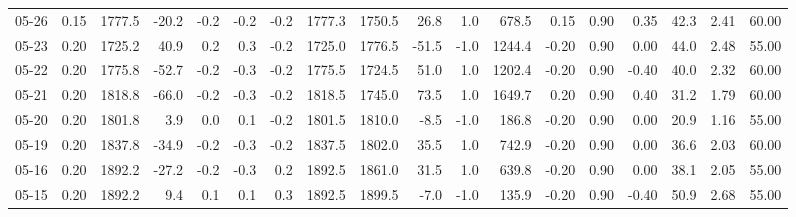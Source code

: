 \begin{threeparttable}
{\begin{tabular}{lrrrrrrrrrrrrrrrrr}
  05-26 &     0.15 & 1777.5 &             -20.2 &              -0.2 &               -0.2 &               -0.2 & 1777.3 & 1750.5 &       26.8 &                      1.0 &               678.5 &       0.15 &      0.90 &           0.35 &             42.3 &            2.41 &                  60.00 \\
  05-23 &     0.20 & 1725.2 &              40.9 &               0.2 &                0.3 &               -0.2 & 1725.0 & 1776.5 &      -51.5 &                     -1.0 &              1244.4 &      -0.20 &      0.90 &           0.00 &             44.0 &            2.48 &                  55.00 \\
  05-22 &     0.20 & 1775.8 &             -52.7 &              -0.2 &               -0.3 &               -0.2 & 1775.5 & 1724.5 &       51.0 &                      1.0 &              1202.4 &      -0.20 &      0.90 &          -0.40 &             40.0 &            2.32 &                  60.00 \\
  05-21 &     0.20 & 1818.8 &             -66.0 &              -0.2 &               -0.3 &               -0.2 & 1818.5 & 1745.0 &       73.5 &                      1.0 &              1649.7 &       0.20 &      0.90 &           0.40 &             31.2 &            1.79 &                  60.00 \\
  05-20 &     0.20 & 1801.8 &               3.9 &               0.0 &                0.1 &               -0.2 & 1801.5 & 1810.0 &       -8.5 &                     -1.0 &               186.8 &      -0.20 &      0.90 &           0.00 &             20.9 &            1.16 &                  55.00 \\
  05-19 &     0.20 & 1837.8 &             -34.9 &              -0.2 &               -0.3 &               -0.2 & 1837.5 & 1802.0 &       35.5 &                      1.0 &               742.9 &      -0.20 &      0.90 &           0.00 &             36.6 &            2.03 &                  60.00 \\
  05-16 &     0.20 & 1892.2 &             -27.2 &              -0.2 &               -0.3 &                0.2 & 1892.5 & 1861.0 &       31.5 &                      1.0 &               639.8 &      -0.20 &      0.90 &           0.00 &             38.1 &            2.05 &                  55.00 \\
  05-15 &     0.20 & 1892.2 &               9.4 &               0.1 &                0.1 &                0.3 & 1892.5 & 1899.5 &       -7.0 &                     -1.0 &               135.9 &      -0.20 &      0.90 &          -0.40 &             50.9 &            2.68 &                  55.00 \\

\end{tabular}}
\end{threeparttable}
